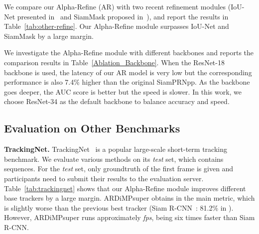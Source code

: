 \documentclass[final]{cvpr}
\begin{document}
We compare our Alpha-Refine (AR) with two recent refinement modules (IoU-Net presented in~\cite{ATOM,DiMP} 
and SiamMask proposed in~\cite{SiamMask}), and report the results in Table~\ref{tab:other-refine}. 
Our Alpha-Refine module surpasses IoU-Net and SiamMask by a large margin.


We investigate the Alpha-Refine module with different backbones and reports the comparison results in 
Table~\ref{Ablation_Backbone}. 
When the ResNet-18 backbone is used, the latency of our AR model is very low but the corresponding 
performance is also 7.4\% higher than the original SiamPRNpp.
As the backbone goes deeper, the AUC score is better but the speed is slower. In this work, we choose 
ResNet-34 as the default backbone to balance accuracy and speed. 
\begin{table}[h]
\caption{Accuracy and Speed Comparison of SiamRPNpp+AR with different backbones. \label{Ablation_Backbone}}
\vspace{-2mm}
\begin{center}
\end{center}
\vspace{-6mm}
\end{table}

\subsection{Evaluation on Other Benchmarks}
\label{sec_sota}
{\noindent \textbf{TrackingNet.}}
TrackingNet~\cite{Trackingnet} is a popular large-scale short-term tracking benchmark. 
We evaluate various methods on its \emph{test} set, which contains  sequences.
For the \emph{test} set, only groundtruth of the first frame is given and participants 
need to submit their results to the evaluation server.  
Table~\ref{tab:trackingnet} shows that our Alpha-Refine module improves different  
base trackers by a large margin. 
ARDiMPsuper obtains  in the main  metric, which is slightly worse 
than the previous best tracker (Siam R-CNN~\cite{SiamRCNN}: 81.2\% in ). 
However, ARDiMPsuper runs approximately  \emph{fps}, being six times faster than Siam R-CNN. 
\end{document}

